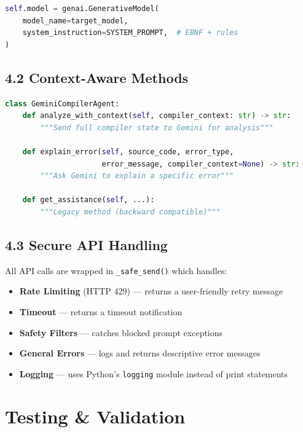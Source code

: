 \documentclass[a4paper,11pt]{article}
\begin{document}
    \begin{lstlisting}[language=Python, caption=System Prompt Injection]
self.model = genai.GenerativeModel(
    model_name=target_model,
    system_instruction=SYSTEM_PROMPT,  # EBNF + rules
)
    \end{lstlisting}

    \subsection{4.2 Context-Aware Methods}

    \begin{lstlisting}[language=Python, caption=New API Methods]
class GeminiCompilerAgent:
    def analyze_with_context(self, compiler_context: str) -> str:
        """Send full compiler state to Gemini for analysis"""

    def explain_error(self, source_code, error_type,
                      error_message, compiler_context=None) -> str:
        """Ask Gemini to explain a specific error"""

    def get_assistance(self, ...):
        """Legacy method (backward compatible)"""
    \end{lstlisting}

    \subsection{4.3 Secure API Handling}

    All API calls are wrapped in \texttt{\_safe\_send()} which handles:
    \begin{itemize}
        \item \textbf{Rate Limiting} (HTTP 429) --- returns a user-friendly retry message
        \item \textbf{Timeout} --- returns a timeout notification
        \item \textbf{Safety Filters} --- catches blocked prompt exceptions
        \item \textbf{General Errors} --- logs and returns descriptive error messages
        \item \textbf{Logging} --- uses Python's \texttt{logging} module instead of print statements
    \end{itemize}

    \section{Testing \& Validation}
\end{document}
